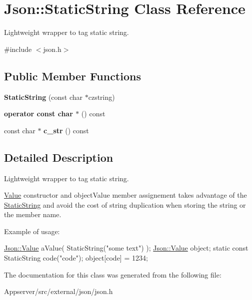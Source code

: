 \hypertarget{classJson_1_1StaticString}{}\section{Json\+:\+:Static\+String Class Reference}
\label{classJson_1_1StaticString}


Lightweight wrapper to tag static string.  




{\ttfamily \#include $<$json.\+h$>$}

\subsection*{Public Member Functions}
\begin{DoxyCompactItemize}
\item 
{\bfseries Static\+String} (const char $\ast$czstring)\hypertarget{classJson_1_1StaticString_afb6baf1ec078ce76f0b0f9b39d19437f}{}\label{classJson_1_1StaticString_afb6baf1ec078ce76f0b0f9b39d19437f}

\item 
{\bfseries operator const char $\ast$} () const\hypertarget{classJson_1_1StaticString_a256a6cc0c630aef670848a0f11707b62}{}\label{classJson_1_1StaticString_a256a6cc0c630aef670848a0f11707b62}

\item 
const char $\ast$ {\bfseries c\+\_\+str} () const\hypertarget{classJson_1_1StaticString_ad6be703d432d108623bb0aa06b0b90ca}{}\label{classJson_1_1StaticString_ad6be703d432d108623bb0aa06b0b90ca}

\end{DoxyCompactItemize}


\subsection{Detailed Description}
Lightweight wrapper to tag static string. 

\hyperlink{classJson_1_1Value}{Value} constructor and object\+Value member assignement takes advantage of the \hyperlink{classJson_1_1StaticString}{Static\+String} and avoid the cost of string duplication when storing the string or the member name.

Example of usage\+: 
\begin{DoxyCode}
\hyperlink{classJson_1_1Value}{Json::Value} aValue( StaticString(\textcolor{stringliteral}{"some text"}) );
\hyperlink{classJson_1_1Value}{Json::Value} object;
\textcolor{keyword}{static} \textcolor{keyword}{const} StaticString code(\textcolor{stringliteral}{"code"});
\textcolor{keywordtype}{object}[code] = 1234;
\end{DoxyCode}
 

The documentation for this class was generated from the following file\+:\begin{DoxyCompactItemize}
\item 
Appserver/src/external/json/json.\+h\end{DoxyCompactItemize}
